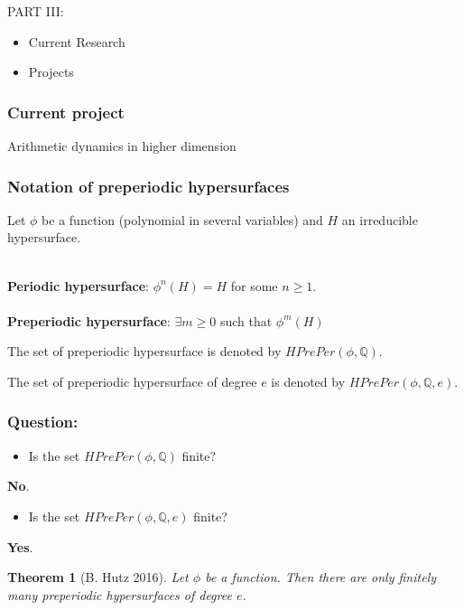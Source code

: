 \documentclass{beamer}
\def\QQ{{\mathbb Q}}
\theoremstyle{thmstyle}
\theoremstyle{thmstyle}
\newtheorem*{mythm}{Theorem}
\theoremstyle{thmstyle}
\theoremstyle{mystyle}
\theoremstyle{qstnstyle}
\begin{document}
\begin{frame}
PART III:
\begin{itemize}
\item Current Research
\item Projects
\end{itemize}
\end{frame}

\begin{frame}
\frametitle{Current project}
\Huge{Arithmetic dynamics in higher dimension}
\end{frame}

\begin{frame}
\frametitle{Notation of preperiodic hypersurfaces}
Let $\phi$ be a function (polynomial in several variables) and $H$ an irreducible hypersurface.
\\\quad\\
\pause

\textbf{Periodic hypersurface}: $\phi^n(H)=H$ for some $n\geq{1}$.
\vspace{2mm}
\\\quad\\

\textbf{Preperiodic hypersurface}: $\exists m\geq{0}$ such that $\phi^m(H)$

The set of preperiodic hypersurface is denoted by $HPrePer(\phi,\QQ)$.

The set of preperiodic hypersurface of degree $e$ is denoted by $HPrePer(\phi,\QQ,e)$.
\end{frame}


\begin{frame}
\frametitle{Question:}
\begin{itemize}
\item Is the set $HPrePer(\phi,\QQ)$ finite? 
\end{itemize}
\pause \textbf{No}. 
\vspace{6mm}\pause

\begin{itemize}
\item Is the set $HPrePer(\phi,\QQ,e)$ finite? 
\end{itemize}
\pause \textbf{Yes}. 
\vspace{6mm}\pause



\begin{mythm}[B. Hutz 2016]
Let $\phi$ be a function. Then there are only finitely many preperiodic hypersurfaces of degree $e$.
\end{mythm}
\end{frame}
\end{document}
